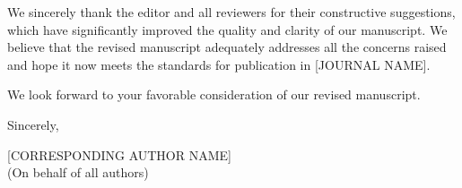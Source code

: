 \documentclass[12pt]{article}
\begin{document}
\bigskip

We sincerely thank the editor and all reviewers for their constructive suggestions, which have significantly improved the quality and clarity of our manuscript. We believe that the revised manuscript adequately addresses all the concerns raised and hope it now meets the standards for publication in [JOURNAL NAME].

We look forward to your favorable consideration of our revised manuscript.

\bigskip

Sincerely,

\bigskip

[CORRESPONDING AUTHOR NAME] \\
(On behalf of all authors)
\end{document}
